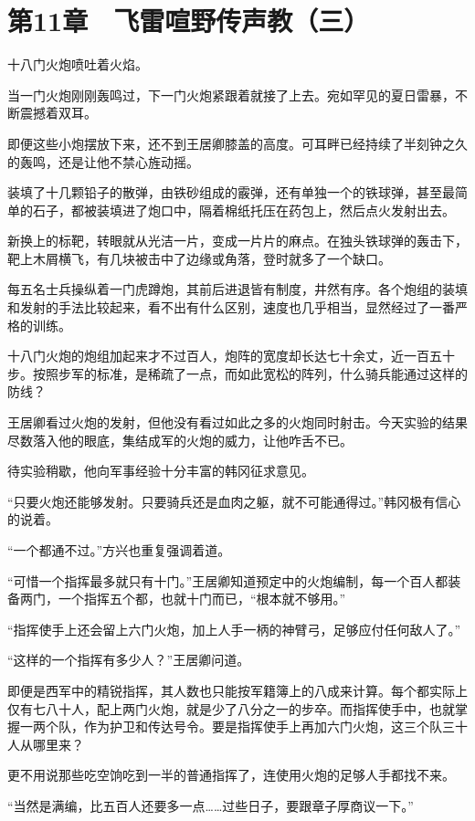 \section{第11章　飞雷喧野传声教（三）}

十八门火炮喷吐着火焰。

当一门火炮刚刚轰鸣过，下一门火炮紧跟着就接了上去。宛如罕见的夏日雷暴，不断震撼着双耳。

即便这些小炮摆放下来，还不到王居卿膝盖的高度。可耳畔已经持续了半刻钟之久的轰鸣，还是让他不禁心旌动摇。

装填了十几颗铅子的散弹，由铁砂组成的霰弹，还有单独一个的铁球弹，甚至最简单的石子，都被装填进了炮口中，隔着棉纸托压在药包上，然后点火发射出去。

新换上的标靶，转眼就从光洁一片，变成一片片的麻点。在独头铁球弹的轰击下，靶上木屑横飞，有几块被击中了边缘或角落，登时就多了一个缺口。

每五名士兵操纵着一门虎蹲炮，其前后进退皆有制度，井然有序。各个炮组的装填和发射的手法比较起来，看不出有什么区别，速度也几乎相当，显然经过了一番严格的训练。

十八门火炮的炮组加起来才不过百人，炮阵的宽度却长达七十余丈，近一百五十步。按照步军的标准，是稀疏了一点，而如此宽松的阵列，什么骑兵能通过这样的防线？

王居卿看过火炮的发射，但他没有看过如此之多的火炮同时射击。今天实验的结果尽数落入他的眼底，集结成军的火炮的威力，让他咋舌不已。

待实验稍歇，他向军事经验十分丰富的韩冈征求意见。

“只要火炮还能够发射。只要骑兵还是血肉之躯，就不可能通得过。”韩冈极有信心的说着。

“一个都通不过。”方兴也重复强调着道。

“可惜一个指挥最多就只有十门。”王居卿知道预定中的火炮编制，每一个百人都装备两门，一个指挥五个都，也就十门而已，“根本就不够用。”

“指挥使手上还会留上六门火炮，加上人手一柄的神臂弓，足够应付任何敌人了。”

“这样的一个指挥有多少人？”王居卿问道。

即便是西军中的精锐指挥，其人数也只能按军籍簿上的八成来计算。每个都实际上仅有七八十人，配上两门火炮，就是少了八分之一的步卒。而指挥使手中，也就掌握一两个队，作为护卫和传达号令。要是指挥使手上再加六门火炮，这三个队三十人从哪里来？

更不用说那些吃空饷吃到一半的普通指挥了，连使用火炮的足够人手都找不来。

“当然是满编，比五百人还要多一点……过些日子，要跟章子厚商议一下。”

